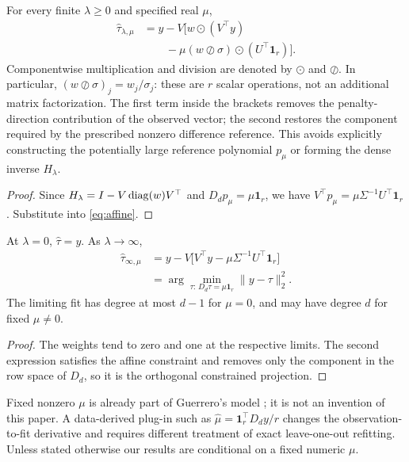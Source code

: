 \begin{proposition}\label{prop:shiftfree}
For every finite $\lambda\ge0$ and specified real $\mu$,
\begin{equation}\label{eq:shiftfree}
\begin{aligned}
\widehat\tau_{\lambda,\mu}
&=y-V\bigl[w\odot(V^\top y)\\
&\qquad-\mu(w\oslash\sigma)\odot(U^\top\mathbf1_r)\bigr].
\end{aligned}
\end{equation}
Componentwise multiplication and division are denoted
by $\odot$ and $\oslash$.
In particular, $(w\oslash\sigma)_j=w_j/\sigma_j$:
these are $r$ scalar operations, not an
additional matrix factorization.
The first term inside the brackets removes
the penalty-direction contribution of the
observed vector; the second restores the
component required by the prescribed
nonzero difference reference. This avoids
explicitly constructing the potentially
large reference polynomial $p_\mu$ or
forming the dense inverse $H_\lambda$.
\end{proposition}
\begin{proof}
Since $H_\lambda=I-V\operatorname{diag}(w)V^\top$ and $D_dp_\mu=\mu\mathbf1_r$, we have $V^\top p_\mu=\mu\Sigma^{-1}U^\top\mathbf1_r$. Substitute into \eqref{eq:affine}.
\end{proof}

\begin{corollary}\label{cor:endfits}
At $\lambda=0$, $\widehat\tau=y$. As $\lambda\to\infty$,
\begin{equation}\label{eq:inftyfit}
\begin{aligned}
\widehat\tau_{\infty,\mu}
&=y-V\bigl[V^\top y-\mu\Sigma^{-1}U^\top\mathbf1_r\bigr]\\
&=\arg\min_{\tau:\,D_d\tau=\mu\mathbf1_r}\|y-\tau\|_2^2.
\end{aligned}
\end{equation}
The limiting fit has degree at most $d-1$ for $\mu=0$, and may have degree $d$ for fixed $\mu\ne0$.
\end{corollary}
\begin{proof}
The weights tend to zero and one at the respective limits. The second expression satisfies the affine constraint and removes only the component in the row space of $D_d$, so it is the orthogonal constrained projection.
\end{proof}

Fixed nonzero $\mu$ is already part of Guerrero's model \citep{guerrero2007}; it is not an invention of this paper. A data-derived plug-in such as $\widehat\mu=\mathbf1_r^\top D_dy/r$ changes the observation-to-fit derivative and requires different treatment of exact leave-one-out refitting. Unless stated otherwise our results are conditional on a fixed numeric $\mu$.


